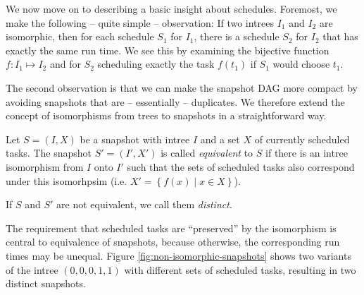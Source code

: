 We now move on to describing a basic insight about schedules. Foremost, we make the following -- quite simple -- observation: If two intrees $I_1$ and $I_2$ are isomorphic, then for each schedule $S_1$ for $I_1$, there is a schedule $S_2$ for $I_2$ that has exactly the same run time. We see this by examining the bijective function $f:I_1 \mapsto I_2$ and for $S_2$ scheduling exactly the task $f(t_1)$ if $S_1$ would choose $t_1$.

The second observation is that we can make the snapshot DAG more compact by avoiding snapshots that are -- essentially -- duplicates. We therefore extend the concept of isomorphisms from trees to snapshots in a straightforward way.

\begin{definition}
  Let $S=(I, X)$ be a snapshot with intree $I$ and a set $X$ of currently scheduled tasks. The snapshot $S'=(I', X')$ is called \emph{equivalent} to $S$ if there is an intree isomorphism from $I$ onto $I'$ such that the sets of scheduled tasks also correspond under this isomorhpsim 
  (i.e. $X' = \left\{ f(x) \mid x\in X \right\}$).

  If $S$ and $S'$ are not equivalent, we call them \emph{distinct}.
\end{definition}

The requirement that scheduled tasks are ``preserved'' by the isomorphism is central to equivalence of snapshots, because otherwise, the corresponding run times may be unequal. Figure \ref{fig:non-isomorphic-snapshots} shows two variants of the intree $(0,0,0,1,1)$ with different sets of scheduled tasks, resulting in two distinct snapshots.

